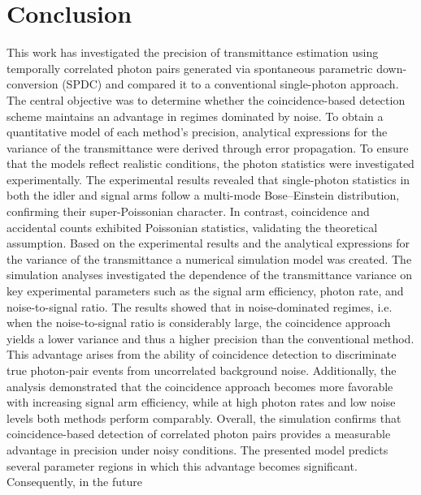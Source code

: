 \section{Conclusion}
This work has investigated the precision of transmittance estimation using temporally correlated photon pairs generated via spontaneous parametric down-conversion (SPDC) and compared it to a conventional single-photon approach. The central objective was to determine whether the coincidence-based detection scheme maintains an advantage in regimes dominated by noise. \newline
To obtain a quantitative model of each method’s precision, analytical expressions for the variance of the transmittance were derived through error propagation. To ensure that the models reflect realistic conditions, the photon statistics were investigated experimentally. \newline
The experimental results revealed that single-photon statistics in both the idler and signal arms follow a multi-mode Bose–Einstein distribution, confirming their super-Poissonian character. In contrast, coincidence and accidental counts exhibited Poissonian statistics, validating the theoretical assumption. Based on the experimental results and the analytical expressions for the variance of the transmittance a numerical simulation model was created. \newline
The simulation analyses investigated the dependence of the transmittance variance on key experimental parameters such as the signal arm efficiency, photon rate, and noise-to-signal ratio. The results showed that in noise-dominated regimes, i.e. when the noise-to-signal ratio is considerably large, the coincidence approach yields a lower variance and thus a higher precision than the conventional method. This advantage arises from the ability of coincidence detection to discriminate true photon-pair events from uncorrelated background noise. Additionally, the analysis demonstrated that the coincidence approach becomes more favorable with increasing signal arm efficiency, while at high photon rates and low noise levels both methods perform comparably. \newline
Overall, the simulation confirms that coincidence-based detection of correlated photon pairs provides a measurable advantage in precision under noisy conditions. The presented model predicts several parameter regions in which this advantage becomes significant. Consequently, in the future 


